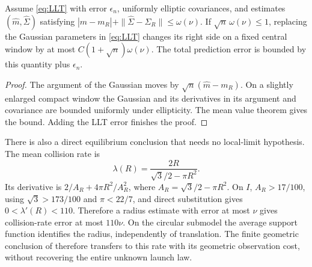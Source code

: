 \begin{proposition}\label{prop:prediction}
Assume \eqref{eq:LLT} with error $\epsilon_n$, uniformly elliptic covariances, and estimates $(\widehat m,\widehat\Sigma)$ satisfying $|\widehat m-m_R|+\|\widehat\Sigma-\Sigma_R\|\le\omega(\nu)$. If $\sqrt n\,\omega(\nu)\le1$, replacing the Gaussian parameters in \eqref{eq:LLT} changes its right side on a fixed central window by at most $C(1+\sqrt n)\omega(\nu)$. The total prediction error is bounded by this quantity plus $\epsilon_n$.
\end{proposition}
\begin{proof}
The argument of the Gaussian moves by $\sqrt n(\widehat m-m_R)$. On a slightly enlarged compact window the Gaussian and its derivatives in its argument and covariance are bounded uniformly under ellipticity. The mean value theorem gives the bound. Adding the LLT error finishes the proof.
\end{proof}

There is also a direct equilibrium conclusion that needs no local-limit hypothesis. The mean collision rate is
\[
 \lambda(R)=\frac{2R}{\sqrt3/2-\pi R^2}.
\]
Its derivative is $2/A_R+4\pi R^2/A_R^2$, where $A_R=\sqrt3/2-\pi R^2$. On $I$, $A_R>17/100$, using $\sqrt3>173/100$ and $\pi<22/7$, and direct substitution gives $0<\lambda'(R)<110$. Therefore a radius estimate with error at most $\nu$ gives collision-rate error at most $110\nu$. On the circular submodel the average support function identifies the radius, independently of translation. The finite geometric conclusion of \cite{A2G} therefore transfers to this rate with its geometric observation cost, without recovering the entire unknown launch law.

